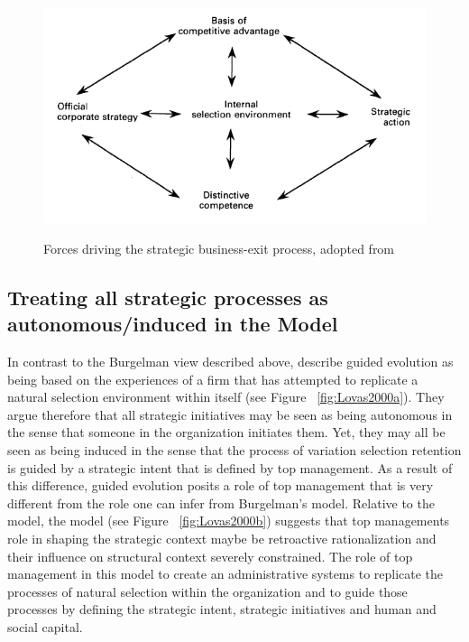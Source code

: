 \documentclass[12pt,letterpaper]{article}
\begin{document}
\begin{figure}[h]
\begin{centering}
  \caption{Forces driving the strategic business-exit process, adopted from \cite{Burgelman1994}}
  \includegraphics[width=\textwidth]{Burgelman1994}
  \label{fig:Burgelman1994}
\end{centering}
\end{figure}

\subsection{Treating all strategic processes as autonomous/induced in the \cite{Lovas2000} Model}
In contrast to the Burgelman view described above, \cite{Lovas2000} describe guided evolution as being based on the experiences of a firm that has attempted to replicate a natural selection environment within itself (see Figure ~\ref{fig:Lovas2000a}). They argue therefore that all strategic initiatives may be seen as being autonomous in the sense that someone in the organization initiates them. Yet, they may all be seen as being induced in the sense that the process of variation selection retention is guided by a strategic intent that is defined by top management. As a result of this difference, guided evolution posits a role of top management that is very different from the role one can infer from Burgelman's model. Relative to the \cite{Burgelman1991} model, the \cite{Lovas2000} model  (see Figure ~\ref{fig:Lovas2000b}) suggests that top management\textquotesingle s role in shaping the strategic context maybe be retroactive rationalization and their influence on structural context  severely constrained. The role of top management in this model to create an administrative systems to replicate the processes of natural selection within the organization and to guide those processes by defining the strategic intent, strategic initiatives and human and social capital. 
\end{document}
